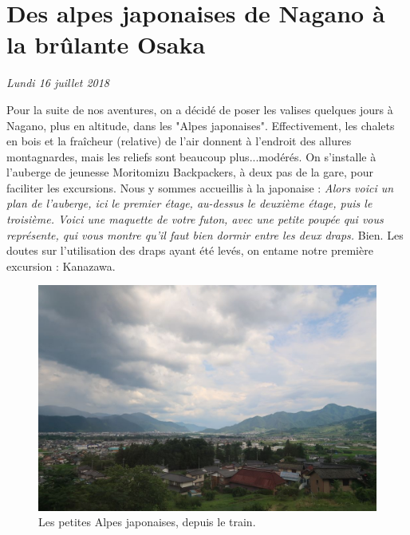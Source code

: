 \hypertarget{des-alpes-japonaises-de-nagano-uxe0-la-bruxfblante-osaka}{%
\section{Des alpes japonaises de Nagano à la brûlante
Osaka}\label{des-alpes-japonaises-de-nagano-uxe0-la-bruxfblante-osaka}}

\emph{Lundi 16 juillet 2018}

Pour la suite de nos aventures, on a décidé de poser les valises
quelques jours à Nagano, plus en altitude, dans les "Alpes japonaises".
Effectivement, les chalets en bois et la fraîcheur (relative) de l'air
donnent à l'endroit des allures montagnardes, mais les reliefs sont
beaucoup plus...modérés. On s'installe à l'auberge de jeunesse
Moritomizu Backpackers, à deux pas de la gare, pour faciliter les
excursions. Nous y sommes accueillis à la japonaise : \emph{Alors voici
un plan de l'auberge, ici le premier étage, au-dessus le deuxième étage,
puis le troisième. Voici une maquette de votre futon, avec une petite
poupée qui vous représente, qui vous montre qu'il faut bien dormir entre
les deux draps.} Bien. Les doutes sur l'utilisation des draps ayant été
levés, on entame notre première excursion : Kanazawa.

\begin{figure}
\centering
\includegraphics{images/20180723_nagano.JPG}
\caption{Les petites Alpes japonaises, depuis le train.}
\end{figure}

